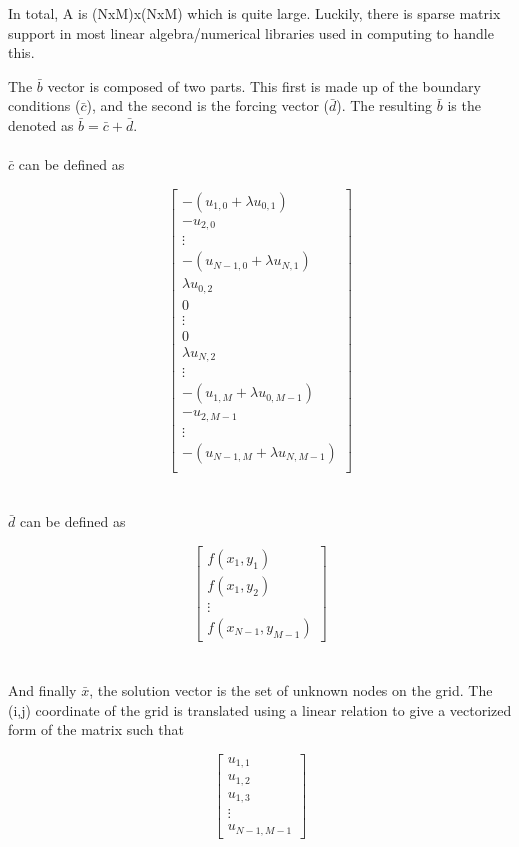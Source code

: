 \documentclass[]{aiaa-tc}%
\begin{document}
In total, A is (NxM)x(NxM) which is quite large. Luckily, there is sparse matrix
support in most linear algebra/numerical libraries used in computing to handle this.

The $\bar b$ vector is composed of two parts. This first is made up of the boundary
conditions ($\bar c$), and the second is the forcing vector ($\bar d$). The resulting
$\bar b$ is the denoted as $\bar b = \bar c  + \bar d$.
\\\\
$\bar c$ can be defined as

$$
\begin{bmatrix}
  -( u_{1,0} + \lambda u_{0,1}) \\
  -u_{2,0} \\
    \vdots \\
  -( u_{N-1,0} + \lambda u_{N,1}) \\
  \lambda u_{0,2} \\
    0 \\
  \vdots \\
    0 \\
  \lambda u_{N,2} \\
  \vdots \\
  -( u_{1,M} + \lambda u_{0,M-1}) \\
  -u_{2,M-1} \\
    \vdots \\
  -( u_{N-1,M} + \lambda u_{N,M-1}) \\
\end{bmatrix}
$$
\\\\
$\bar d$ can be defined as

$$
\begin{bmatrix}
  f(x_1,y_1) \\
  f(x_1,y_2) \\
  \vdots \\
  f(x_{N-1},y_{M-1})
\end{bmatrix}
$$
\\\\
And finally $\bar x$, the solution vector is the set of unknown nodes on the grid.
The (i,j) coordinate of the grid is translated using a linear relation to give
a vectorized form of the matrix such that

$$
\begin{bmatrix}
  u_{1,1} \\
  u_{1,2} \\
  u_{1,3} \\
  \vdots \\
  u_{N-1,M-1}
\end{bmatrix}
$$
\end{document}
